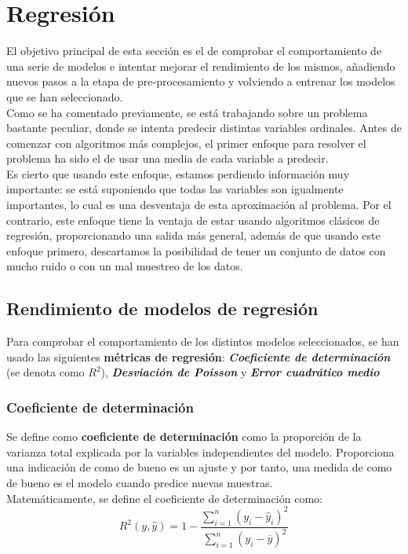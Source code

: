 \chapter{Regresión}
El objetivo principal de esta sección es el de comprobar el comportamiento de una serie de modelos e intentar mejorar el rendimiento de los mismos, añadiendo nuevos pasos a la etapa de pre-procesamiento y volviendo a entrenar los modelos que se han seleccionado. \\
Como se ha comentado previamente, se está trabajando sobre un problema bastante peculiar, donde se intenta predecir distintas variables ordinales. Antes de comenzar con algoritmos más complejos, el primer enfoque para resolver el problema ha sido el de usar una media de cada variable a predecir. \\
Es cierto que usando este enfoque, estamos perdiendo información muy importante: se está suponiendo que todas las variables son igualmente importantes, lo cual es una desventaja de esta aproximación al problema.
Por el contrario, este enfoque tiene la ventaja de estar usando algoritmos clásicos de regresión, proporcionando una salida más general, además de que usando este enfoque primero, descartamos la posibilidad de tener un conjunto de datos con mucho ruido o con un mal muestreo de los datos.
\section{Rendimiento de modelos de regresión}
Para comprobar el comportamiento de los distintos modelos seleccionados, se han usado las siguientes \textbf{métricas de regresión}: \textit{\textbf{Coeficiente de determinación}} (se denota como $R^2$), \textit{\textbf{Desviación de Poisson}} y \textit{\textbf{Error cuadrático medio}}
\subsection{Coeficiente de determinación}
Se define como \textbf{coeficiente de determinación} como la proporción de la varianza total explicada por la variables independientes del modelo. Proporciona una indicación de como de bueno es un ajuste y por tanto, una medida de como de bueno es el modelo cuando predice nuevas muestras.\\
\linebreak
Matemáticamente, se define el coeficiente de determinación como:
\[
	R^2 (y, \hat{y}) = 1 - \frac{\sum_{i=1}^{n}(y_i - \hat{y}_i)^2}    {\sum_{i=1}^{n} (y_i - \overline{y})^2}
\]

